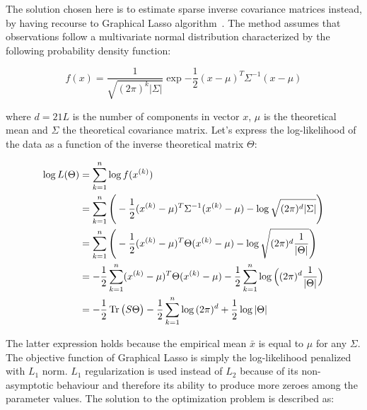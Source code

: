         The solution chosen here is to estimate sparse inverse covariance matrices instead,
        by having recourse to Graphical Lasso algorithm~\cite{graphicalLasso}.
        The method assumes that observations follow a multivariate normal distribution
        characterized by the following probability density function:

        \begin{equation}
            f(x) = \frac{1}{\sqrt{(2\pi)^k \vert\Sigma\vert}} \exp{-\frac{1}{2} (x - \mu)^T \Sigma^{-1} (x - \mu)}
        \end{equation}

        where $d=21L$ is the number of components in vector $x$, $\mu$ is the theoretical mean and $\Sigma$ the theoretical covariance matrix.
        Let's express the log-likelihood of the data as a function of the inverse theoretical matrix $\Theta$:

        \begin{equation}
            \begin{split}
                \log{L}(\Theta) & = \sum\limits_{k=1}^{n} \log{f(x^{(k)})} \\
                & = \sum\limits_{k=1}^{n} \Bigg( -\frac{1}{2} (x^{(k)} - \mu)^T \Sigma^{-1} (x^{(k)} - \mu) - \log{\sqrt{(2\pi)^d \vert\Sigma\vert}} \Bigg) \\
                & = \sum\limits_{k=1}^{n} \Bigg( -\frac{1}{2} (x^{(k)} - \mu)^T \Theta (x^{(k)} - \mu) - \log{\sqrt{(2\pi)^d \frac{1}{\vert\Theta\vert}}} \Bigg) \\
                & = -\frac{1}{2} \sum\limits_{k=1}^{n} (x^{(k)} - \mu)^T \Theta (x^{(k)} - \mu) 
                    - \frac{1}{2} \sum\limits_{k=1}^{n} \log{\Big((2\pi)^d \frac{1}{\vert\Theta\vert}\Big)} \\
                & = -\frac{1}{2} \operatorname{Tr}\big(S \Theta\big) - \frac{1}{2} \sum\limits_{k=1}^{n} \log{(2\pi)^d} + \frac{1}{2} \log{\vert\Theta\vert} \\
            \end{split}
        \end{equation}

        The latter expression holds because the empirical mean $\bar{x}$ is equal to $\mu$ for any $\Sigma$.
        The objective function of Graphical Lasso is simply the log-likelihood penalized with $L_1$ norm. $L_1$ regularization is used instead of $L_2$ because
        of its non-asymptotic behaviour and therefore its ability to produce more zeroes among the parameter values.
        The solution to the optimization problem is described as:


